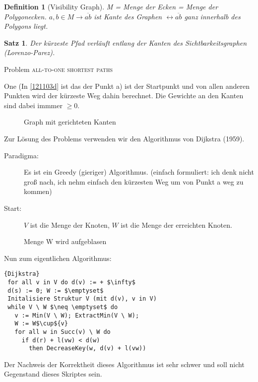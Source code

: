 \documentclass[ngerman,draft,parskip=half*,twoside]{scrreprt}
\theoremstyle{break}
\newtheorem{satz}{Satz}[chapter]
\newtheorem{definition}{Definition}[chapter]
\theoremstyle{nonumberbreak}
\begin{document}
\begin{definition}[Visibility Graph]
M = Menge der Ecken = Menge der Polygonecken.
$a, b \in M \rightarrow \overline{ab}$ ist Kante des Graphen $\leftrightarrow \overline{ab}$ ganz innerhalb des Polygons liegt.
\end{definition}

\begin{satz}
Der kürzeste Pfad verläuft entlang der Kanten des Sichtbarkeitsgraphen (Lorenzo-Parez).
\end{satz}
Problem \textsc{all-to-one shortest paths}

One (In \autoref{121103d} ist das der Punkt a) ist der Startpunkt und von allen anderen
Punkten wird der kürzeste Weg dahin berechnet.
Die Gewichte an den Kanten sind dabei immmer $\geq 0$.

\begin{figure}[ht]
  \centering
  \caption{Graph mit gerichteten Kanten}
  \label{121103d}
\end{figure}

Zur Lösung des Problems verwenden wir den Algorithmus von Dijkstra (1959).

\begin{description}
\item[Paradigma: ] Es ist ein Greedy (gieriger) Algorithmus.
(einfach formuliert: ich denk nicht groß nach, ich nehm einfach den kürzesten Weg um von Punkt a weg zu kommen)
\item[Start: ] $V$ ist die Menge der Knoten, $W$ ist die Menge der erreichten Knoten.
\end{description}

\begin{figure}[H]
  \centering
  \caption{Menge W wird aufgeblasen}
  \label{121103e}
\end{figure}
Nun zum eigentlichen Algorithmus:

\begin{Algorithmus}[ht]
\begin{lstlisting}[frame=tlrb, mathescape=true, title=\textsc{Dijkstra}, gobble=1]{Dijkstra}
 for all v in V do d(v) := + $\infty$
 d(s) := 0; W := $\emptyset$
 Initalisiere Struktur V (mit d(v), v in V)
 while V \ W $\neq \emptyset$ do
   v := Min(V \ W); ExtractMin(V \ W);
   W := W$\cup${v}
   for all w in Succ(v) \ W do
     if d(r) + l(vw) < d(w)
       then DecreaseKey(w, d(v) + l(vw))
\end{lstlisting}

Der Nachweis der Korrektheit dieses Algorithmus ist sehr schwer und soll nicht Gegenstand
dieses Skriptes sein.
\end{Algorithmus}   %
\end{document}
